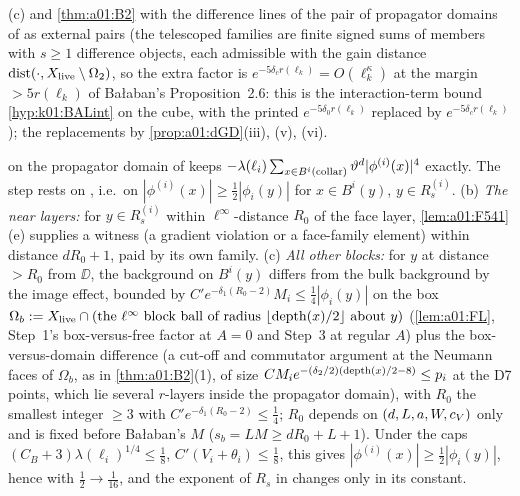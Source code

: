 \begin{description}[leftmargin=1.5em,style=nextline]
\item[{D6 (expansion to order $\bar n$, cumulants, removal of the interaction from $\Lambda_7^c$; \cite[(2.22)--(2.28), Prop.~2.6]{Ba2})}] (c) and \cref{thm:a01:B2} with the difference lines of the pair of propagator domains of \cite[Prop.~2.6]{Ba2} as external pairs (the telescoped families are finite signed sums of members with $s\ge1$ difference objects, each admissible with the gain distance $\operatorname{dist}(\cdot,X_{\mathrm{live}}\setminus\Omega_2)$, so the extra factor is $e^{-5\delta_cr(\ell_k)}=O(\ell_k^{\kappa})$ at the margin $>5r(\ell_k)$ of Ba{\l}aban's Proposition~2.6: this is the interaction-term bound \cref{hyp:k01:BALint} on the cube, with the printed $e^{-5\delta_0r(\ell_k)}$ replaced by $e^{-5\delta_cr(\ell_k)}$); the replacements \cite[(2.108)--(2.115)]{Ba2} by \cref{prop:a01:dGD}(iii), (v), (vi).
\item[{D7 (the collar quartic; \cite[Prop.~2.1, (2.57), (2.79)]{Ba2})}]  on the propagator domain of \cite[(2.56)]{Ba2} keeps $-\lambda(\ell_i)\sum_{x\in B^i(\mathrm{collar})}\vartheta^d|\phi^{(i)}(x)|^4$ exactly. The step \cite[(2.79)]{Ba2} rests on \cite[(2.65)]{Ba2}, i.e.\ on $|\phi^{(i)}(x)|\ge\frac12|\phi_i(y)|$ for $x\in B^i(y)$, $y\in R_s^{(i)}$. (b) \emph{The near layers:} for $y\in R_s^{(i)}$ within $\ell^\infty$-distance $R_0$ of the face layer, \cref{lem:a01:F541}(e) supplies a witness (a gradient violation or a face-family element) within distance $dR_0+1$, paid by its own family. (c) \emph{All other blocks:} for $y$ at distance $>R_0$ from $\DD$, the background on $B^i(y)$ differs from the bulk background by the image effect, bounded by $C'e^{-\delta_1(R_0-2)}M_i\le\frac14|\phi_i(y)|$ on the box $\Omega_b:=X_{\mathrm{live}}\cap(\text{the }\ell^\infty\text{ block ball of radius }\lfloor\operatorname{depth}(x)/2\rfloor\text{ about }y)$ (\cref{lem:a01:FL}, Step~1's box-versus-free factor at $A=0$ and Step~3 at regular $A$) plus the box-versus-domain difference (a cut-off and commutator argument at the Neumann faces of $\Omega_b$, as in \cref{thm:a01:B2}(1), of size $CM_ie^{-(\delta_2/2)(\operatorname{depth}(x)/2-8)}\le p_i$ at the D7 points, which lie several $r$-layers inside the propagator domain), with $R_0$ the smallest integer $\ge3$ with $C'e^{-\delta_1(R_0-2)}\le\frac14$; $R_0$ depends on $(d,L,a,W,c_V)$ only and is fixed before Ba{\l}aban's $M$ ($s_b=LM\ge dR_0+L+1$). Under the caps $(C_B+3)\lambda(\ell_i)^{1/4}\le\frac18$, $C'(V_i+\theta_i)\le\frac18$, this gives $|\phi^{(i)}(x)|\ge\frac12|\phi_i(y)|$, hence \cite[(2.79)]{Ba2} with $\frac12\to\frac1{16}$, and the exponent of $R_s$ in \cite[(3.41)]{Ba2} changes only in its constant.

\end{description}
